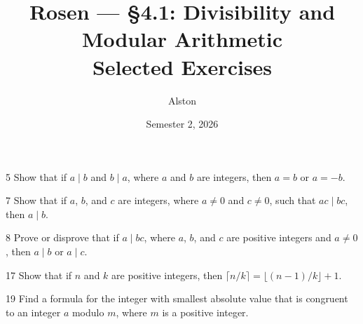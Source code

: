 \documentclass[11pt]{article}
\title{Rosen --- \S 4.1: Divisibility and Modular Arithmetic\\ \large Selected Exercises}
\author{Alston}
\date{Semester 2, 2026}
\begin{document}
\maketitle

\begin{exercise}{5}
    Show that if $a \mid b$ and $b \mid a$, where $a$ and $b$ are
    integers, then $a = b$ or $a = -b$.
\end{exercise}

\begin{exercise}{7}
    Show that if $a$, $b$, and $c$ are integers, where $a \neq 0$ and
    $c \neq 0$, such that $ac \mid bc$, then $a \mid b$.
\end{exercise}

\begin{exercise}{8}
    Prove or disprove that if $a \mid bc$, where $a$, $b$, and $c$
    are positive integers and $a \neq 0$, then $a \mid b$ or
    $a \mid c$.
\end{exercise}

\begin{exercise}{17}
    Show that if $n$ and $k$ are positive integers, then
    $\lceil n/k \rceil = \lfloor (n-1)/k \rfloor + 1$.
\end{exercise}

\begin{exercise}{19}
    Find a formula for the integer with smallest absolute value that
    is congruent to an integer $a$ modulo $m$, where $m$ is a
    positive integer.
\end{exercise}
\end{document}
